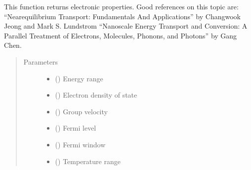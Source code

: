 \documentclass[letterpaper,10pt,english]{sphinxmanual}
\begin{document}
\begin{fulllineitems}
\label{\detokenize{autosummary/ThermoElectric.electrical_properties:ThermoElectric.electrical_properties}}
\sphinxAtStartPar
This function returns electronic properties.
Good references on this topic are:
“Near\sphinxhyphen{}equilibrium Transport: Fundamentals And Applications” by Changwook Jeong and Mark S. Lundstrom
“Nanoscale Energy Transport and Conversion: A Parallel Treatment of Electrons, Molecules, Phonons, and Photons” by Gang Chen.
\begin{quote}\begin{description}
\item[{Parameters}] \leavevmode\begin{itemize}
\item {} 
\sphinxAtStartPar
{} () \textendash{} Energy range

\item {} 
\sphinxAtStartPar
{} () \textendash{} Electron density of state

\item {} 
\sphinxAtStartPar
{} () \textendash{} Group velocity

\item {} 
\sphinxAtStartPar
{} () \textendash{} Fermi level

\item {} 
\sphinxAtStartPar
{} () \textendash{} Fermi window

\item {} 
\sphinxAtStartPar
{} () \textendash{} Temperature range


\end{itemize}
\end{description}
\end{quote}
\end{fulllineitems}
\end{document}
